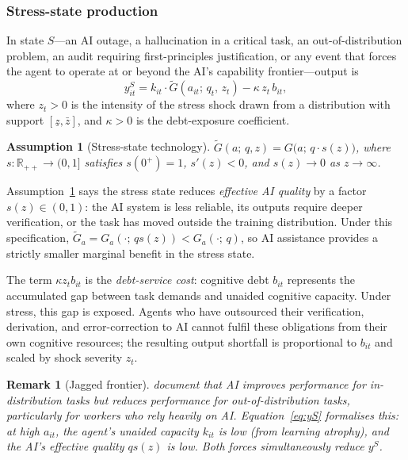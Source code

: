 \documentclass[12pt]{article}
\newtheorem{assumption}{Assumption}
\newtheorem{remark}{Remark}
\newcommand{\R}{\mathbb{R}}
\begin{document}
\subsubsection*{Stress-state production}

In state $S$---an AI outage, a hallucination in a critical task, an out-of-distribution
problem, an audit requiring first-principles justification, or any event that forces
the agent to operate at or beyond the AI's capability frontier---output is
\begin{equation}
y_{it}^{S} = k_{it} \cdot \tilde{G}(a_{it};\, q_t,\, z_t) - \kappa\, z_t\, b_{it},
\label{eq:yS}
\end{equation}
where $z_t > 0$ is the intensity of the stress shock drawn from a distribution with
support $[\underline{z}, \bar{z}]$, and $\kappa > 0$ is the debt-exposure coefficient.

\begin{assumption}[Stress-state technology]
\label{ass:Gtilde}
$\tilde{G}(a;\, q, z) = G\bigl(a;\, q \cdot s(z)\bigr)$, where
$s : \R_{++} \to (0, 1]$ satisfies $s(0^+) = 1$, $s'(z) < 0$, and $s(z) \to 0$
as $z \to \infty$.
\end{assumption}

Assumption~\ref{ass:Gtilde} says the stress state reduces \emph{effective AI quality}
by a factor $s(z) \in (0,1)$: the AI system is less reliable, its outputs require
deeper verification, or the task has moved outside the training distribution. Under this
specification, $\tilde{G}_a = G_a(\cdot;\, q s(z)) < G_a(\cdot;\, q)$, so AI assistance
provides a strictly smaller marginal benefit in the stress state.

The term $\kappa z_t b_{it}$ is the \emph{debt-service cost}: cognitive debt $b_{it}$
represents the accumulated gap between task demands and unaided cognitive capacity.
Under stress, this gap is exposed. Agents who have outsourced their verification,
derivation, and error-correction to AI cannot fulfil these obligations from their
own cognitive resources; the resulting output shortfall is proportional to $b_{it}$
and scaled by shock severity $z_t$.

\begin{remark}[Jagged frontier]
\citet{DellAcquaEtAl2023} document that AI improves performance for in-distribution
tasks but reduces performance for out-of-distribution tasks, particularly for
workers who rely heavily on AI. Equation~\eqref{eq:yS} formalises this: at high
$a_{it}$, the agent's unaided capacity $k_{it}$ is low (from learning atrophy), and
the AI's effective quality $q s(z)$ is low. Both forces simultaneously reduce $y^S$.
\end{remark}
\end{document}
